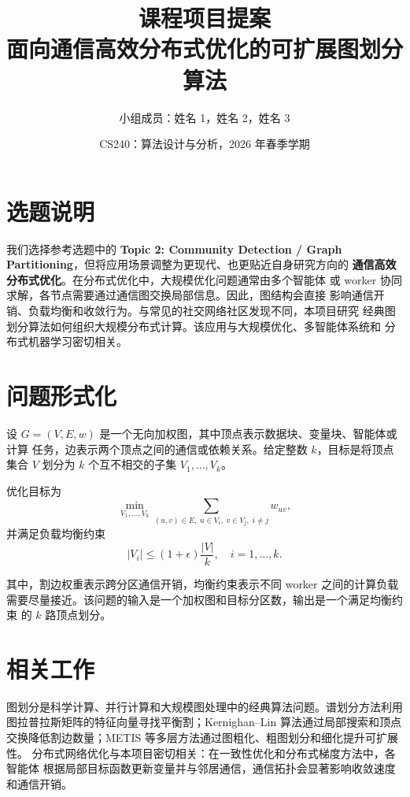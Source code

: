 \documentclass[UTF8, 10pt]{ctexart}
\title{\textbf{课程项目提案}\\
面向通信高效分布式优化的可扩展图划分算法}
\author{小组成员：姓名 1，姓名 2，姓名 3}
\date{CS240：算法设计与分析，2026 年春季学期}
\begin{document}
\maketitle

\section{选题说明}

我们选择参考选题中的 \textbf{Topic 2: Community Detection / Graph
Partitioning}，但将应用场景调整为更现代、也更贴近自身研究方向的
\textbf{通信高效分布式优化}。在分布式优化中，大规模优化问题通常由多个智能体
或 worker 协同求解，各节点需要通过通信图交换局部信息。因此，图结构会直接
影响通信开销、负载均衡和收敛行为。与常见的社交网络社区发现不同，本项目研究
经典图划分算法如何组织大规模分布式计算。该应用与大规模优化、多智能体系统和
分布式机器学习密切相关。

\section{问题形式化}

设 $G=(V,E,w)$ 是一个无向加权图，其中顶点表示数据块、变量块、智能体或计算
任务，边表示两个顶点之间的通信或依赖关系。给定整数 $k$，目标是将顶点集合
$V$ 划分为 $k$ 个互不相交的子集 $V_1,\ldots,V_k$。

优化目标为
\[
    \min_{V_1,\ldots,V_k}
    \sum_{(u,v)\in E,\; u\in V_i,\; v\in V_j,\; i\neq j} w_{uv},
\]
并满足负载均衡约束
\[
    |V_i| \leq (1+\epsilon)\frac{|V|}{k},
    \quad i=1,\ldots,k.
\]

其中，割边权重表示跨分区通信开销，均衡约束表示不同 worker 之间的计算负载
需要尽量接近。该问题的输入是一个加权图和目标分区数，输出是一个满足均衡约束
的 $k$ 路顶点划分。

\section{相关工作}

图划分是科学计算、并行计算和大规模图处理中的经典算法问题。谱划分方法利用
图拉普拉斯矩阵的特征向量寻找平衡割；Kernighan--Lin 算法通过局部搜索和顶点
交换降低割边数量；METIS 等多层方法通过图粗化、粗图划分和细化提升可扩展性。
分布式网络优化与本项目密切相关：在一致性优化和分布式梯度方法中，各智能体
根据局部目标函数更新变量并与邻居通信，通信拓扑会显著影响收敛速度和通信开销。
\end{document}
